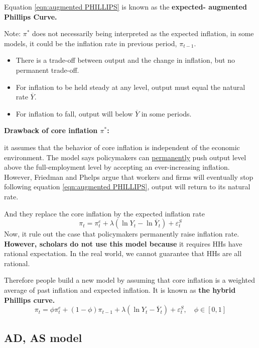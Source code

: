 \documentclass[12pt]{article}
\begin{document}
Equation \eqref{eqn:augmented PHILLIPS} is known as the {\textbf {expected-
augmented Phillips Curve.}}

Note: $ \pi^{*} $ does not necessarily being interpreted as the expected inflation,
in some models, it could be the inflation rate in previous period, $ \pi_{t - 1} $.

\begin{itemize}
\item There is a trade-off between output and the change in inflation, but no
		permanent trade-off.
\item For inflation to be held steady at any level, output must equal the natural rate
		$  \overline{Y} $.
\item For inflation to fall, output will below $  \overline{Y} $ in some periods.
\end{itemize}
{\textbf {Drawback of core inflation $ \pi^{*} $:}}

it assumes that the behavior of core inflation is independent of the economic 
environment. The model says policymakers can {\underline {permanently}} push output
level above the full-employment level by accepting an ever-increasing inflation.
However, Friedman and Phelps argue that workers and firms will eventually stop following
equation \eqref{eqn:augmented PHILLIPS}, output will return to its natural rate.

And they replace the core inflation by the expected inflation rate
\begin{equation}
\label{eqn:inflation e}
\pi_{t} = \pi_{t}^{e} + \lambda(\ln Y_{t} - \ln  \overline{Y}_{t}) + \varepsilon_{t}
^{S}
\end{equation}
Now, it rule out the case that policymakers permanently raise inflation rate.
{\textbf {However, scholars do not use this model because}} it requires HHs have
rational expectation. In the real world, we cannot guarantee that HHs are all rational.


Therefore people build a new model by assuming that core inflation is a weighted average
of past inflation and expected inflation.
It is known as {\textbf {the hybrid Phillips curve.}}
\begin{equation*}
\pi_{t} = \phi \pi_{t}^{e} + (1 - \phi)\pi_{t - 1} + \lambda(\ln Y_{t} - 
\overline{Y}_{t}) + \varepsilon_{t}^{S}, \quad \phi \in [0,1]
\end{equation*}




\subsection{AD, AS model}
\end{document}
